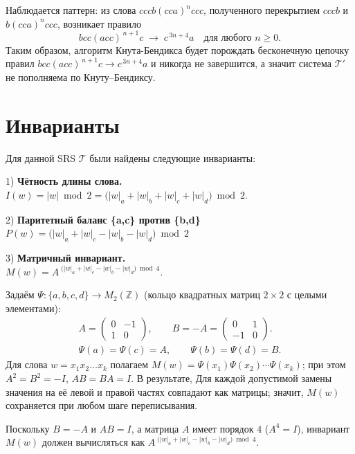 \documentclass[12pt,a4paper]{article}
\begin{document}
Наблюдается паттерн: из слова \(cccb(cca)^nccc\), полученного перекрытием \(cccb\) и \(b(cca)^nccc\), возникает правило
\[
bcc(acc)^{\,n+1}c \;\to\; c^{\,3n+4}a \quad \text{для любого } n\ge 0.
\]
Таким образом, алгоритм Кнута-Бендикса будет порождать бесконечную цепочку правил \(bcc(acc)^{\,n+1}c \to c^{\,3n+4}a\) и никогда не завершится, а значит система \(\mathcal{T}'\) не пополняема по Кнуту–Бендиксу.


\section*{Инварианты}
Для данной SRS \(\mathcal{T}\) были найдены следующие инварианты:

1) \textbf{Чётность длины слова.}  \\
\(I(w)=|w|\bmod 2=\big(|w|_{a}+|w|_{b}+|w|_{c}+|w|_{d}\big)\bmod 2.\)

2) \textbf{Паритетный баланс \{a,c\} против \{b,d\}}\\
\(P(w)=\big(|w|_{a}+|w|_{c}-|w|_{b}-|w|_{d}\big)\bmod 2\)

3) \textbf{Матричный инвариант.}  \\
\(M(w)=A^{\;\big(|w|_{a}+|w|_{c}-|w|_{b}-|w|_{d}\big)\bmod 4}.\)

Задаём \(\Psi:\{a,b,c,d\}\to M_{2}(\mathbb{Z})\) (кольцо квадратных матриц \(2\times2\) с целыми элементами):
\[
\begin{gathered}
A=\begin{pmatrix}0&-1\\[2pt]1&0\end{pmatrix},\qquad
B=-A=\begin{pmatrix}0&1\\[2pt]-1&0\end{pmatrix}.
\\[4pt]
\Psi(a)=\Psi(c)=A,\qquad \Psi(b)=\Psi(d)=B.
\end{gathered}
\]
Для слова \(w=x_1x_2\ldots x_k\) полагаем \(M(w)=\Psi(x_1)\Psi(x_2)\cdots\Psi(x_k)\); при этом \(A^{2}=B^{2}=-I\), \(AB=BA=I\). В результате, Для каждой допустимой замены значения на её левой и правой частях совпадают как матрицы; значит, 
\(M(w)\) сохраняется при любом шаге переписывания.

Поскольку \(B=-A\) и \(AB=I\), а матрица \(A\) имеет порядок \(4\) (\(A^{4}=I\)), инвариант \(M(w)\) должен вычисляться как \(A^{\;\big(|w|_{a}+|w|_{c}-|w|_{b}-|w|_{d}\big)\bmod 4}\).
\end{document}
